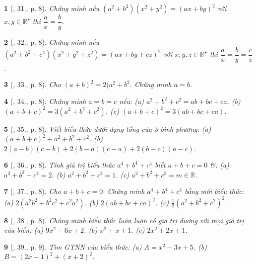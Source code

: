 \documentclass{article}
\newtheorem{baitoan}{}
\begin{document}
\begin{baitoan}[\cite{Binh_Toan_8_tap_1}, 31., p. 8]
	Chứng minh nếu $(a^2 + b^2)(x^2 + y^2) = (ax + by)^2$ với $x,y\in\mathbb{R}^\star$ thì $\dfrac{a}{x} = \dfrac{b}{y}$.
\end{baitoan}

\begin{baitoan}[\cite{Binh_Toan_8_tap_1}, 32., p. 8]
	Chứng minh nếu $(a^2 + b^2 + c^2)(x^2 + y^2 + z^2) = (ax + by + cz)^2$ với $x,y,z\in\mathbb{R}^\star$ thì $\dfrac{a}{x} = \dfrac{b}{y} = \dfrac{c}{z}$.
\end{baitoan}

\begin{baitoan}[\cite{Binh_Toan_8_tap_1}, 33., p. 8]
	Cho $(a + b)^2 = 2(a^2 + b^2$. Chứng minh $a = b$.
\end{baitoan}

\begin{baitoan}[\cite{Binh_Toan_8_tap_1}, 34., p. 8]
	Chứng minh $a = b = c$ nếu: (a) $a^2 + b^2 + c^2 = ab + bc + ca$. (b) $(a + b + c)^2 = 3(a^2 + b^2 + c^2)$. (c) $(a + b + c)^2 = 3(ab + bc + ca)$.
\end{baitoan}

\begin{baitoan}[\cite{Binh_Toan_8_tap_1}, 35., p. 8]
	Viết biểu thức dưới dạng tổng của 3 bình phương: (a) $(a + b + c)^2 + a^2 + b^2 + c^2$. (b) $2(a - b)(c - b) + 2(b - a)(c - a) + 2(b - c)(a - c)$.
\end{baitoan}

\begin{baitoan}[\cite{Binh_Toan_8_tap_1}, 36., p. 8]
	Tính giá trị biểu thức $a^4 + b^4 + c^4$ biết $a + b + c = 0$ \&: (a) $a^2 + b^2 + c^2 = 2$. (b) $a^2 + b^2 + c^2 = 1$. (c) $a^2 + b^2 + c^2 = m\in\mathbb{R}$.
\end{baitoan}

\begin{baitoan}[\cite{Binh_Toan_8_tap_1}, 37., p. 8]
	Cho $a + b + c = 0$. Chứng minh $a^4 + b^4 + c^4$ bằng mỗi biểu thức: (a) $2(a^2b^2 + b^2c^2 + c^2a^2)$. (b) $2(ab + bc + ca)^2$. (c) $\frac{1}{2}(a^2 + b^2 + c^2)^2$.
\end{baitoan}

\begin{baitoan}[\cite{Binh_Toan_8_tap_1}, 38., p. 8]
	Chứng minh biểu thức luôn luôn có giá trị dương với mọi giá trị của biến: (a) $9x^2 - 6x + 2$. (b) $x^2 + x + 1$. (c) $2x^2 + 2x + 1$.
\end{baitoan}

\begin{baitoan}[\cite{Binh_Toan_8_tap_1}, 39., p. 9]
	Tìm {\rm GTNN} của biểu thức: (a) $A = x^2 - 3x + 5$. (b) $B = (2x - 1)^2 + (x + 2)^2$.
\end{baitoan}
\end{document}
